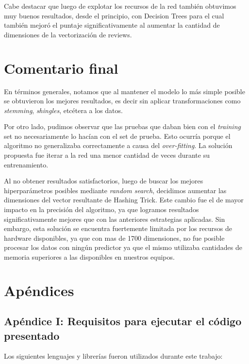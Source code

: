 \documentclass[10pt,a4paper]{article}
\begin{document}
Cabe destacar que luego de explotar los recursos de la red también obtuvimos muy buenos resultados, desde el principio, con Decision Trees para el cual también mejoró el puntaje significativamente al aumentar la cantidad de dimensiones de la vectorización de reviews.


\section{Comentario final}

En términos generales, notamos que al mantener el modelo lo más simple posible se obtuvieron los mejores resultados, es decir sin aplicar transformaciones como \textit{stemming}, \textit{shingles}, etcétera a los datos. 

Por otro lado, pudimos observar que las pruebas que daban bien con el \textit{training} set no necesariamente lo hacían con el set de prueba. Esto ocurría porque el algoritmo no  generalizaba correctamente a causa del \textit{over-fitting}. La solución propuesta fue iterar a la red una menor cantidad de  veces durante su entrenamiento.

Al no obtener resultados satisfactorios, luego de buscar los mejores hiperparámetros posibles  mediante \textit{random search}, decidimos aumentar las dimensiones del vector resultante de Hashing Trick. Este cambio fue el de mayor impacto en la precisión del algoritmo, ya que logramos resultados significativamente mejores que con las anteriores estrategias aplicadas. Sin embargo, esta solución se encuentra fuertemente limitada por los recursos de hardware disponibles, ya que con mas de 1700 dimensiones, no fue posible procesar los datos con ningún predictor ya que el mismo utilizaba cantidades de memoria superiores a las disponibles en nuestros equipos.

\pagebreak

\section{Apéndices}
\subsection{Apéndice I: Requisitos para ejecutar el código presentado}
Los siguientes lenguajes y librerías fueron utilizados durante este trabajo:
\end{document}
